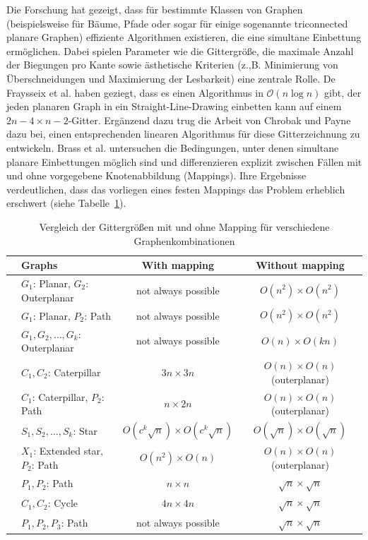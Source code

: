 \documentclass[bachelor, german]{algothesis}
\begin{document}
Die Forschung hat gezeigt, dass für bestimmte Klassen von Graphen (beispielsweise für Bäume, Pfade oder sogar für einige sogenannte triconnected planare Graphen) effiziente Algorithmen existieren, die eine simultane Einbettung ermöglichen. Dabei spielen Parameter wie die Gittergröße, die maximale Anzahl der Biegungen pro Kante sowie ästhetische Kriterien (z.,B. Minimierung von Überschneidungen und Maximierung der Lesbarkeit) eine zentrale Rolle.\newline
De Fraysseix et al. \cite{DeFraysseix1990} haben geziegt, dass es einen Algorithmus in $\mathcal{O}(n \log n)$ gibt, der jeden planaren Graph in ein Straight-Line-Drawing einbetten kann auf einem $2n-4\times n-2$-Gitter. Ergänzend dazu trug die Arbeit von Chrobak und Payne \cite{CHROBAK1995241} dazu bei, einen entsprechenden linearen Algorithmus für diese Gitterzeichnung zu entwickeln.\newline
Brass et al. \cite{BRASS2007117}  untersuchen die Bedingungen, unter denen simultane planare Einbettungen möglich sind und differenzieren explizit zwischen Fällen mit und ohne vorgegebene Knotenabbildung (Mappings). Ihre Ergebnisse verdeutlichen, dass das vorliegen eines festen Mappings das Problem erheblich erschwert (siehe Tabelle~\ref{tab:graph-mapping}).\newline
\begin{table}[H]
\centering
\begin{tabular}{llcc}
\toprule
\textbf{} & \textbf{Graphs} & \textbf{With mapping} & \textbf{Without mapping} \\
\midrule
& $G_1$: Planar, $G_2$: Outerplanar & not always possible & $O(n^2) \times O(n^2)$ \\
& $G_1$: Planar, $P_2$: Path & not always possible & $O(n^2) \times O(n^2)$ \\
& $G_1, G_2, \dots, G_k$: Outerplanar & not always possible & $O(n) \times O(kn)$ \\
& $C_1, C_2$: Caterpillar & $3n \times 3n$ & $O(n) \times O(n)$ (outerplanar) \\
& $C_1$: Caterpillar, $P_2$: Path & $n \times 2n$ & $O(n) \times O(n)$ (outerplanar) \\
& $S_1, S_2, \dots, S_k$: Star & $O(c^k \sqrt{n}) \times O(c^k \sqrt{n})$ & $O(\sqrt{n}) \times O(\sqrt{n})$ \\
& $X_1$: Extended star, $P_2$: Path & $O(n^2) \times O(n)$ & $O(n) \times O(n)$ (outerplanar) \\
& $P_1, P_2$: Path & $n \times n$ & $\sqrt{n} \times \sqrt{n}$ \\
& $C_1, C_2$: Cycle & $4n \times 4n$ & $\sqrt{n} \times \sqrt{n}$ \\
& $P_1, P_2, P_3$: Path & not always possible & $\sqrt{n} \times \sqrt{n}$ \\
\bottomrule
\end{tabular}
\caption{Vergleich der Gittergrößen mit und ohne Mapping für verschiedene Graphenkombinationen\protect\footnotemark}
\label{tab:graph-mapping}
\end{table}
\end{document}
